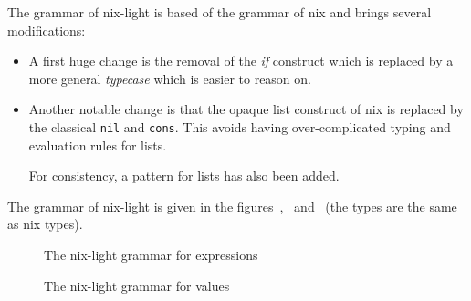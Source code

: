 The grammar of nix-light is based of the grammar of nix and brings several
modifications:
\begin{itemize}
  \item A first huge change is the removal of the \emph{if} construct which is
    replaced by a more general \emph{typecase} which is easier to reason on.

  \item Another notable change is that the opaque list construct of nix is
    replaced by the classical \texttt{nil} and \texttt{cons}.
    This avoids having over-complicated typing and evaluation rules for lists.

    For consistency, a pattern for lists has also been added.
\end{itemize}

The grammar of nix-light is given in the
figures~,~
and~ (the types are the same as nix types).

\begin{figure}
  
  \caption{\label{grammar::expressions}The nix-light grammar for expressions}
\end{figure}

\begin{figure}
  
  \caption{\label{grammar::values}The nix-light grammar for values}
\end{figure}
